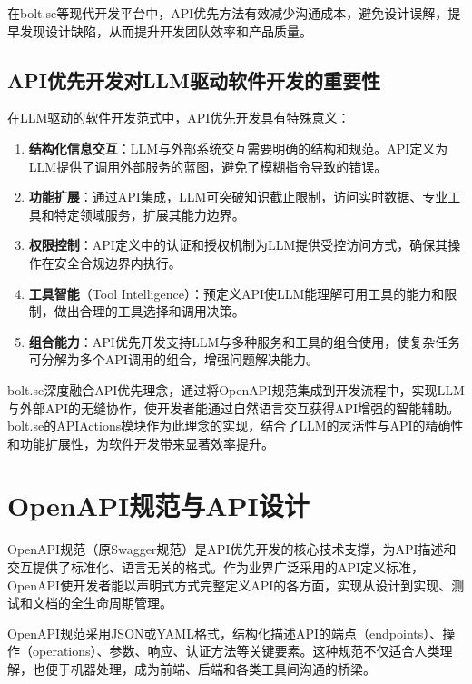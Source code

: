 在bolt.se等现代开发平台中，API优先方法有效减少沟通成本，避免设计误解，提早发现设计缺陷，从而提升开发团队效率和产品质量。

\subsection{API优先开发对LLM驱动软件开发的重要性}
在LLM驱动的软件开发范式中，API优先开发具有特殊意义：

\begin{enumerate}
  \item \textbf{结构化信息交互}：LLM与外部系统交互需要明确的结构和规范。API定义为LLM提供了调用外部服务的蓝图，避免了模糊指令导致的错误。
  
  \item \textbf{功能扩展}：通过API集成，LLM可突破知识截止限制，访问实时数据、专业工具和特定领域服务，扩展其能力边界。
  
  \item \textbf{权限控制}：API定义中的认证和授权机制为LLM提供受控访问方式，确保其操作在安全合规边界内执行。
  
  \item \textbf{工具智能}（Tool Intelligence）：预定义API使LLM能理解可用工具的能力和限制，做出合理的工具选择和调用决策。
  
  \item \textbf{组合能力}：API优先开发支持LLM与多种服务和工具的组合使用，使复杂任务可分解为多个API调用的组合，增强问题解决能力。
\end{enumerate}

bolt.se深度融合API优先理念，通过将OpenAPI规范集成到开发流程中，实现LLM与外部API的无缝协作，使开发者能通过自然语言交互获得API增强的智能辅助。bolt.se的APIActions模块作为此理念的实现，结合了LLM的灵活性与API的精确性和功能扩展性，为软件开发带来显著效率提升。

\section{OpenAPI规范与API设计}
OpenAPI规范（原Swagger规范）是API优先开发的核心技术支撑，为API描述和交互提供了标准化、语言无关的格式\cite{openapi2023}。作为业界广泛采用的API定义标准，OpenAPI使开发者能以声明式方式完整定义API的各方面，实现从设计到实现、测试和文档的全生命周期管理。

OpenAPI规范采用JSON或YAML格式，结构化描述API的端点（endpoints）、操作（operations）、参数、响应、认证方法等关键要素。这种规范不仅适合人类理解，也便于机器处理，成为前端、后端和各类工具间沟通的桥梁。

